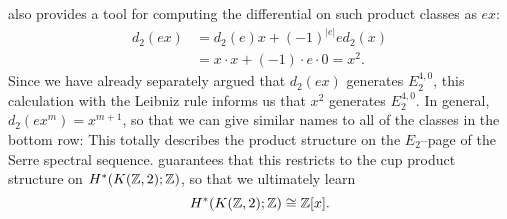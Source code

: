 \begin{example}
 also provides a tool for computing the differential on such product classes as $ex$:
\begin{align*}
d_2(ex) & = d_2(e) x + (-1)^{|e|} e d_2(x) \\
& = x \cdot x + (-1) \cdot e \cdot 0 = x^2.
\end{align*}
Since we have already separately argued that $d_2(ex)$ generates $E_2^{4, 0}$, this calculation with the Leibniz rule informs us that $x^2$ generates $E_2^{4, 0}$.
In general, $d_2(ex^m) = x^{m+1}$, so that we can give similar names to all of the classes in the bottom row:
This totally describes the product structure on the $E_2$--page of the Serre spectral sequence.
 guarantees that this restricts to the cup product structure on $H^*(K(\mathbb Z, 2); \mathbb Z)$, so that we ultimately learn \[H^*(K(\mathbb Z, 2); \mathbb Z) \cong \mathbb Z[x].\]
\end{example}

